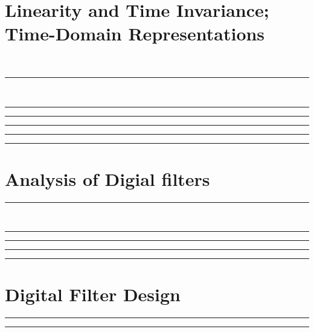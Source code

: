 \documentclass[10pt]{article}
\begin{document}
\newcommand{\josquote}[1]{
    \framebox{
    \parbox{\textwidth}{
    \textit{#1}
    }
    }
}

\newcommand{\paulhint}[1]{
    #1
}

\setlength\parindent{0pt}
\section{Linearity and Time Invariance; Time-Domain Representations}
\\
\noindent\rule[0.5ex]{\linewidth}{0.5pt}
\\
\noindent\rule[0.5ex]{\linewidth}{0.5pt}

\noindent\rule[0.5ex]{\linewidth}{0.5pt}

\noindent\rule[0.5ex]{\linewidth}{0.5pt}

\noindent\rule[0.5ex]{\linewidth}{0.5pt}

\noindent\rule[0.5ex]{\linewidth}{0.5pt}

\section{Analysis of Digial filters}

\noindent\rule[0.5ex]{\linewidth}{0.5pt}
\\
\noindent\rule[0.5ex]{\linewidth}{0.5pt}

\noindent\rule[0.5ex]{\linewidth}{0.5pt}

\noindent\rule[0.5ex]{\linewidth}{0.5pt}

\noindent\rule[0.5ex]{\linewidth}{0.5pt}

\section{Digital Filter Design}

\noindent\rule[0.5ex]{\linewidth}{0.5pt}

\noindent\rule[0.5ex]{\linewidth}{0.5pt}

\end{document}
